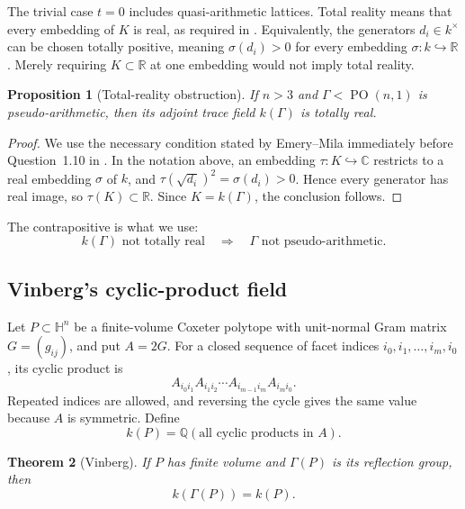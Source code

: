 \documentclass[11pt]{article}
\numberwithin{equation}{section}
\newtheorem{theorem}{Theorem}[section]
\newtheorem{proposition}[theorem]{Proposition}
\theoremstyle{definition}
\theoremstyle{remark}
\newcommand{\Q}{\mathbb{Q}}
\newcommand{\R}{\mathbb{R}}
\newcommand{\C}{\mathbb{C}}
\newcommand{\HH}{\mathbb{H}}
\newcommand{\PO}{\operatorname{PO}}
\begin{document}
The trivial case \(t=0\) includes quasi-arithmetic lattices.
Total reality means that every embedding of \(K\) is real, as required in
\cite[Section~1.4]{EmeryMila}.
Equivalently, the generators \(d_i\in k^\times\) can be chosen totally
positive, meaning \(\sigma(d_i)>0\) for every embedding
\(\sigma:k\hookrightarrow\R\).  Merely requiring \(K\subset\R\) at one
embedding would not imply total reality.

\begin{proposition}[Total-reality obstruction]
\label{prop:total-real-obstruction}
If \(n>3\) and \(\Gamma<\PO(n,1)\) is pseudo-arithmetic, then its adjoint
trace field \(k(\Gamma)\) is totally real.
\end{proposition}

\begin{proof}
We use the necessary condition stated by Emery--Mila immediately before
Question~1.10 in \cite[Section~1.4]{EmeryMila}.  In the notation above, an
embedding \(\tau:K\hookrightarrow\C\) restricts to a real embedding
\(\sigma\) of \(k\), and
\(\tau(\sqrt{d_i})^2=\sigma(d_i)>0\).  Hence every generator has real
image, so \(\tau(K)\subset\R\).  Since \(K=k(\Gamma)\), the conclusion
follows.
\end{proof}

The contrapositive is what we use:
\begin{equation}
 k(\Gamma)\text{ not totally real}
 \quad\Longrightarrow\quad
 \Gamma\text{ not pseudo-arithmetic}.
\label{eq:total-real-contrapositive}
\end{equation}

\subsection{Vinberg's cyclic-product field}
\label{subsec:vinberg}

Let \(P\subset\HH^n\) be a finite-volume Coxeter polytope with unit-normal
Gram matrix \(G=(g_{ij})\), and put \(A=2G\).  For a closed sequence of facet
indices \(i_0,i_1,\ldots,i_m,i_0\), its cyclic product is
\[
 A_{i_0i_1}A_{i_1i_2}\cdots A_{i_{m-1}i_m}A_{i_mi_0}.
\]
Repeated indices are allowed, and reversing the cycle gives the same value
because \(A\) is symmetric.  Define
\[
 k(P)=\Q(\text{all cyclic products in }A).
\]

\begin{theorem}[Vinberg]
\label{thm:vinberg-cycles}
If \(P\) has finite volume and \(\Gamma(P)\) is its reflection group, then
\[
 k(\Gamma(P))=k(P).
\]
\end{theorem}
\end{document}
